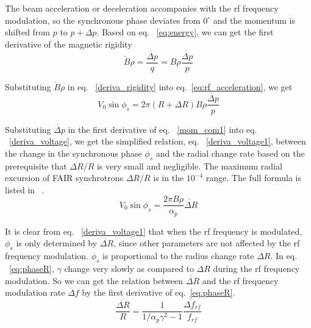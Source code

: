 \begin{itemize}
The beam acceleration or deceleration accompanies with the rf frequency modulation, so the synchronous phase deviates from $0^\circ$ and the momentum is shifted from $p$ to $p+\Delta p$. Based on eq. ~\ref{eq:energy}, we can get the first derivative of the magnetic rigidity
\begin{equation}
	\label{deriva_rigidity}
	\dot{B}\rho =\frac{\dot{\Delta p}}{q}=B\rho \dot{\frac{\Delta p}{p}}
\end{equation}

Substituting $\dot{B}\rho$ in eq. ~\ref{deriva_rigidity} into eq.~\ref{eq:rf_acceleration}, we get 
\begin{equation}
\label{deriva_voltage}
V_0\sin\phi_s=2\pi (R+\Delta R) B\rho \dot{\frac{\Delta p}{p}}
\end{equation} 

Substituting $\dot{\Delta p}$ in the first derivative of eq. ~\ref{mom_com1} into eq. ~\ref{deriva_voltage}, we get the simplified  relation, eq. ~\ref{deriva_voltage1}, between the change in the synchronous phase $\phi_{s}$ and the radial change rate based on the prerequisite that $\Delta R/R$ is very small and negligible. The maximum radial excursion of FAIR synchrotrons $\Delta R/R$ is in the $10^{-4}$ range. The full formula is listed in ~\cite{ezura_beam-dynamics_2008}.
\begin{equation}
\label{deriva_voltage1}
V_0\sin\phi_s=\frac{2\pi B\rho}{\alpha_p} \dot{\Delta R}
\end{equation} 

It is clear from eq. ~\ref{deriva_voltage1} that when the rf frequency is modulated, $\phi_s$ is only determined by $\dot{\Delta R}$, since other parameters are not affected by the rf frequency modulation. $\phi_s$ is proportional to the radius change rate $\dot{\Delta R}$. In eq. ~\ref{eq:phaseR}, $\gamma$ change very slowly as compared to $\Delta R$ during the rf frequency modulation. So we can get the relation between $\dot{\Delta R}$ and the rf frequency modulation rate $\dot{\Delta f}$ by the first derivative of eq.~\ref{eq:phaseR}. 
\begin{equation}
\label{f_R_time}
\frac{\dot{\Delta R}}{R}=\frac{1}{1/\alpha_p\gamma^2-1} \frac{\dot{\Delta f_\mathit{rf}}}{f_\mathit{rf}}
\end{equation} 


\end{itemize}
